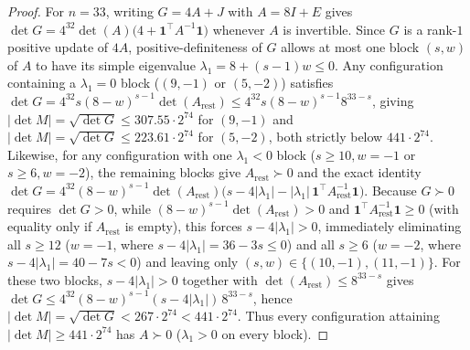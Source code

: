 \documentclass[11pt]{article}
\theoremstyle{remark}
\begin{document}
\begin{proof}
For $n = 33$, writing $G = 4 A + J$ with $A = 8 I + E$ gives $\det G = 4^{32} \det(A)\bigl(4 + \mathbf{1}^\top A^{-1}\mathbf{1}\bigr)$ whenever $A$ is invertible. Since $G$ is a rank-$1$ positive update of $4A$, positive-definiteness of $G$ allows at most one block $(s, w)$ of $A$ to have its simple eigenvalue $\lambda_1 = 8 + (s - 1)w \le 0$. Any configuration containing a $\lambda_1 = 0$ block ($(9, -1)$ or $(5, -2)$) satisfies $\det G = 4^{32} s (8 - w)^{s-1} \det(A_{\mathrm{rest}}) \le 4^{32} s (8 - w)^{s-1} 8^{33-s}$, giving $|\det M| = \sqrt{\det G} \le 307.55 \cdot 2^{74}$ for $(9, -1)$ and $|\det M| = \sqrt{\det G} \le 223.61 \cdot 2^{74}$ for $(5, -2)$, both strictly below $441 \cdot 2^{74}$. Likewise, for any configuration with one $\lambda_1 < 0$ block ($s \ge 10, w = -1$ or $s \ge 6, w = -2$), the remaining blocks give $A_{\mathrm{rest}} \succ 0$ and the exact identity $\det G = 4^{32} (8 - w)^{s-1} \det(A_{\mathrm{rest}}) \bigl(s - 4|\lambda_1| - |\lambda_1|\, \mathbf{1}^\top A_{\mathrm{rest}}^{-1}\mathbf{1}\bigr)$. Because $G \succ 0$ requires $\det G > 0$, while $(8 - w)^{s-1} \det(A_{\mathrm{rest}}) > 0$ and $\mathbf{1}^\top A_{\mathrm{rest}}^{-1}\mathbf{1} \ge 0$ (with equality only if $A_{\mathrm{rest}}$ is empty), this forces $s - 4|\lambda_1| > 0$, immediately eliminating all $s \ge 12$ ($w = -1$, where $s - 4|\lambda_1| = 36 - 3s \le 0$) and all $s \ge 6$ ($w = -2$, where $s - 4|\lambda_1| = 40 - 7s < 0$) and leaving only $(s, w) \in \{(10, -1), (11, -1)\}$. For these two blocks, $s - 4|\lambda_1| > 0$ together with $\det(A_{\mathrm{rest}}) \le 8^{33-s}$ gives $\det G \le 4^{32}(8 - w)^{s-1}(s - 4|\lambda_1|)\, 8^{33-s}$, hence $|\det M| = \sqrt{\det G} < 267 \cdot 2^{74} < 441 \cdot 2^{74}$. Thus every configuration attaining $|\det M| \ge 441 \cdot 2^{74}$ has $A \succ 0$ ($\lambda_1 > 0$ on every block).


\end{proof}
\end{document}
